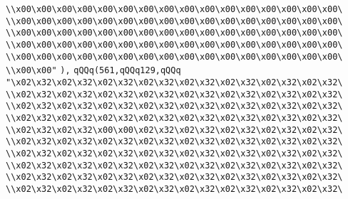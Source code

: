 \verb|\\x00\x00\x00\x00\x00\x00\x00\x00\x00\x00\x00\x00\x00\x00\x00\x00\|\newline
\verb|\\x00\x00\x00\x00\x00\x00\x00\x00\x00\x00\x00\x00\x00\x00\x00\x00\|\newline
\verb|\\x00\x00\x00\x00\x00\x00\x00\x00\x00\x00\x00\x00\x00\x00\x00\x00\|\newline
\verb|\\x00\x00\x00\x00\x00\x00\x00\x00\x00\x00\x00\x00\x00\x00\x00\x00\|\newline
\verb|\\x00\x00\x00\x00\x00\x00\x00\x00\x00\x00\x00\x00\x00\x00\x00\x00\|\newline
\verb|\\x00\x00"|\newline
\verb|),|\newline
\verb|qQQq(561,qQQq129,qQQq|\newline
\verb|"\x02\x32\x02\x32\x02\x32\x02\x32\x02\x32\x02\x32\x02\x32\x02\x32\|\newline
\verb|\\x02\x32\x02\x32\x02\x32\x02\x32\x02\x32\x02\x32\x02\x32\x02\x32\|\newline
\verb|\\x02\x32\x02\x32\x02\x32\x02\x32\x02\x32\x02\x32\x02\x32\x02\x32\|\newline
\verb|\\x02\x32\x02\x32\x02\x32\x02\x32\x02\x32\x02\x32\x02\x32\x02\x32\|\newline
\verb|\\x02\x32\x02\x32\x00\x00\x02\x32\x02\x32\x02\x32\x02\x32\x02\x32\|\newline
\verb|\\x02\x32\x02\x32\x02\x32\x02\x32\x02\x32\x02\x32\x02\x32\x02\x32\|\newline
\verb|\\x02\x32\x02\x32\x02\x32\x02\x32\x02\x32\x02\x32\x02\x32\x02\x32\|\newline
\verb|\\x02\x32\x02\x32\x02\x32\x02\x32\x02\x32\x02\x32\x02\x32\x02\x32\|\newline
\verb|\\x02\x32\x02\x32\x02\x32\x02\x32\x02\x32\x02\x32\x02\x32\x02\x32\|\newline
\verb|\\x02\x32\x02\x32\x02\x32\x02\x32\x02\x32\x02\x32\x02\x32\x02\x32\|\newline
